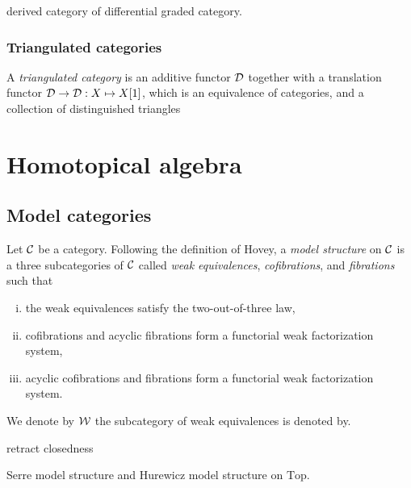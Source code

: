 \documentclass{../../large}
\begin{document}
derived category of differential graded category.



\section{Triangulated categories}


\begin{prb}
A \emph{triangulated category} is an additive functor $\mathcal{D}$ together with a translation functor $\mathcal{D}\to\mathcal{D}:X\mapsto X[1]$, which is an equivalence of categories, and a collection of distinguished triangles 

\end{prb}






\part{Homotopical algebra}

\chapter{Model categories}


\begin{prb}
Let $\mathcal{C}$ be a category.
Following the definition of Hovey, a \emph{model structure} on $\mathcal{C}$ is a three subcategories of $\mathcal{C}$ called \emph{weak equivalences}, \emph{cofibrations}, and \emph{fibrations} such that
\begin{enumerate}[(i)]
\item the weak equivalences satisfy the two-out-of-three law,
\item cofibrations and acyclic fibrations form a functorial weak factorization system,
\item acyclic cofibrations and fibrations form a functorial weak factorization system.
\end{enumerate}
We denote by $\mathcal{W}$ the subcategory of weak equivalences is denoted by.
\begin{parts}
\item retract closedness
\item
\end{parts}
\end{prb}


Serre model structure and Hurewicz model structure on $\mathrm{Top}$.
\end{document}
